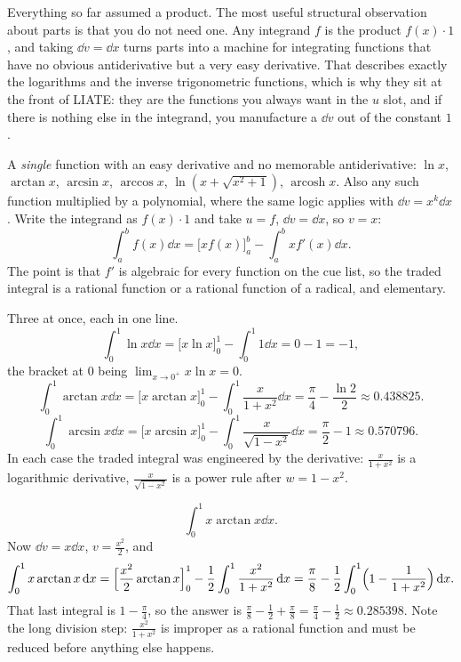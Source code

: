 Everything so far assumed a product. The most useful structural observation about parts is that you do not need one. Any integrand $f$ is the product $f(x)\cdot1$, and taking $\dd v=\dd x$ turns parts into a machine for integrating functions that have no obvious antiderivative but a very easy derivative. That describes exactly the logarithms and the inverse trigonometric functions, which is why they sit at the front of LIATE: they are the functions you always want in the $u$ slot, and if there is nothing else in the integrand, you manufacture a $\dd v$ out of the constant $1$.

\cue A \emph{single} function with an easy derivative and no memorable antiderivative: $\ln x$, $\arctan x$, $\arcsin x$, $\arccos x$, $\ln(x+\sqrt{x^{2}+1})$, $\operatorname{arcosh}x$. Also any such function multiplied by a polynomial, where the same logic applies with $\dd v=x^{k}\dd x$.
\method Write the integrand as $f(x)\cdot1$ and take $u=f$, $\dd v=\dd x$, so $v=x$:
\[\int_a^b f(x)\dd x=\bigl[xf(x)\bigr]_a^b-\int_a^b xf'(x)\dd x.\]
The point is that $f'$ is algebraic for every function on the cue list, so the traded integral is a rational function or a rational function of a radical, and elementary.

\begin{worked}
Three at once, each in one line.
\[\int_0^1\ln x\dd x=\bigl[x\ln x\bigr]_0^1-\int_0^1 1\dd x=0-1=-1,\]
the bracket at $0$ being $\lim_{x\to0^+}x\ln x=0$.
\[\int_0^1\arctan x\dd x=\bigl[x\arctan x\bigr]_0^1-\int_0^1\frac{x}{1+x^{2}}\dd x=\frac{\pi}{4}-\frac{\ln2}{2}\approx0.438825.\]
\[\int_0^1\arcsin x\dd x=\bigl[x\arcsin x\bigr]_0^1-\int_0^1\frac{x}{\sqrt{1-x^{2}}}\dd x=\frac{\pi}{2}-1\approx0.570796.\]
In each case the traded integral was engineered by the derivative: $\tfrac{x}{1+x^{2}}$ is a logarithmic derivative, $\tfrac{x}{\sqrt{1-x^{2}}}$ is a power rule after $w=1-x^{2}$.
\end{worked}

\begin{worked}
\[\int_0^1x\arctan x\dd x.\]
Now $\dd v=x\dd x$, $v=\tfrac{x^{2}}{2}$, and
\[\int_0^1x\arctan x\,\mathrm{d} x=\Bigl[\frac{x^{2}}{2}\arctan x\Bigr]_0^1-\frac12\int_0^1\frac{x^{2}}{1+x^{2}}\,\mathrm{d} x=\frac{\pi}{8}-\frac12\int_0^1\Bigl(1-\frac{1}{1+x^{2}}\Bigr)\,\mathrm{d} x.\]
That last integral is $1-\tfrac{\pi}{4}$, so the answer is $\tfrac{\pi}{8}-\tfrac12+\tfrac{\pi}{8}=\tfrac{\pi}{4}-\tfrac12\approx0.285398$. Note the long division step: $\tfrac{x^{2}}{1+x^{2}}$ is improper as a rational function and must be reduced before anything else happens.
\end{worked}

